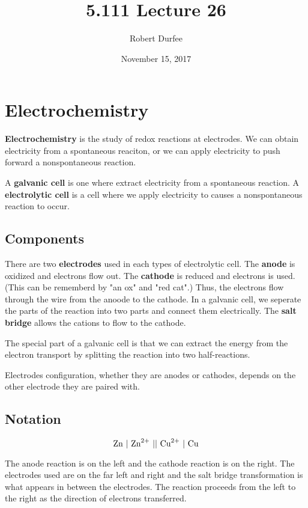 \documentclass{article}
\title{ 5.111 Lecture 26 }
\author{ Robert Durfee }
\date{ November 15, 2017 }
\begin{document}
\maketitle

\section{Electrochemistry }

\textbf{Electrochemistry} is the study of redox reactions at electrodes. We can
obtain electricity from a spontaneous reaciton, or we can apply electricity to
push forward a nonspontaneous reaction.

A \textbf{galvanic cell} is one where extract electricity from a spontaneous
reaction. A \textbf{electrolytic cell} is a cell where we apply electricity to
causes a nonspontaneous reaction to occur.

\subsection{Components}

There are two \textbf{electrodes} used in each types of electrolytic cell. The
\textbf{anode} is oxidized and electrons flow out. The \textbf{cathode} is
reduced and electrons is used. (This can be rememberd by "an ox" and "red cat".)
Thus, the electrons flow through the wire from the anoode to the cathode. In a
galvanic cell, we seperate the parts of the reaction into two parts and connect
them electrically. The \textbf{salt bridge} allows the cations to flow to the
cathode. 

The special part of a galvanic cell is that we can extract the energy from the
electron transport by splitting the reaction into two half-reactions.

Electrodes configuration, whether they are anodes or cathodes, depends on the
other electrode they are paired with.

\subsection{Notation}

$$\ce{Zn\ \vert\ Zn^{2+}\ \vert\vert\ Cu^{2+}\ \vert\ Cu}$$

The anode reaction is on the left and the cathode reaction is on the right. The
electrodes used are on the far left and right and the salt bridge transformation
is what appears in between the electrodes. The reaction proceeds from the left
to the right as the direction of electrons transferred.
\end{document}
